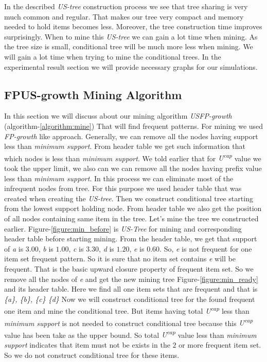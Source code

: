     
    In the described \emph{US-tree} construction process we see that tree sharing is very much common and regular. That makes our tree very compact and memory needed to hold items becomes less. Moreover, the tree construction time improves surprisingly. When to mine this \emph{US-tree} we can gain a lot time when mining. As the tree size is small, conditional tree will be much more less when mining. We will gain a lot time when trying to mine the conditional trees. In the experimental result section we will provide necessary graphs for our simulations.
    \subsection{FPUS-growth Mining Algorithm}
    In this section we will discuss about our mining algorithm \emph{USFP-growth} (algorithm-\ref{algorithm:mine}) That will find frequent patterns. For mining we used \emph{FP-growth} like approach. Generally, we can remove all the nodes having support less than \emph{minimum support}. From header table we get such information that which nodes is less than \emph{minimum support}. We told earlier that for \emph{U\textsuperscript{cap}} value we took the upper limit, we also can we can remove all the nodes having prefix value less than \emph{minimum support}. In this process we can eliminate most of the infrequent nodes from tree. For this purpose we used header table that was created when creating the \emph{US-tree}. Then we construct conditional tree starting from the lowest support holding node. From header table we also get the position of all nodes containing same item in the tree. 
    Let’s mine the tree we constructed earlier. Figure-\ref{figure:min_before} is \emph{US-Tree} for mining and corresponding header table before starting mining. From the header table, we get that support of \emph{a} is $3.00$, \emph{b} is $1.00$, \emph{c} is $3.30$, \emph{d} is $1.20$, \emph{e} is $0.60$. So, \emph{e} is not frequent for one item set frequent pattern. So it is sure that no item set contains \emph{e} will be frequent. That is the basic upward closure property of frequent item set. So we remove all the nodes of \emph{e} and get the new mining tree Figure-\ref{figure:min_ready} and its header table. Here we find all one item sets that are frequent and that is \emph{\{a\}, \{b\}, \{c\} \{d\}} Now we will construct conditional tree for the found frequent one item and mine the conditional tree. But items having total \emph{U\textsuperscript{cap}} less than \emph{minimum support} is not needed to construct conditional tree because this \emph{U\textsuperscript{cap}} value has been take as the upper bound. So total \emph{U\textsuperscript{cap}} value less than \emph{minimum support} indicates that item must not be exists in the $2$ or more frequent item set. So we do not construct conditional tree for these items.
